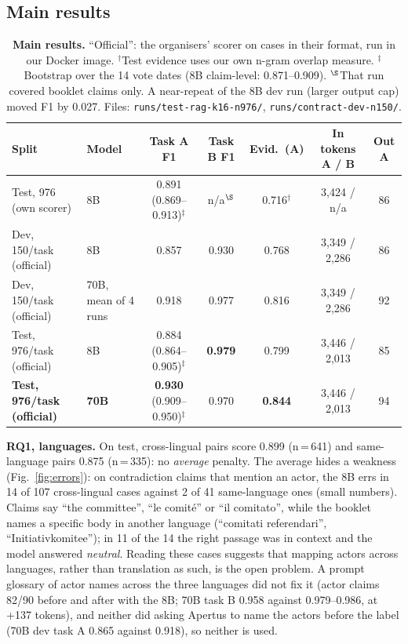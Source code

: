 \documentclass[10pt,a4paper]{article}
\begin{document}
\subsection{Main results}
\begin{table}[h]
\centering\small
\begin{tabular}{@{}llccccc@{}}
\toprule
Split & Model & Task A F1 & Task B F1 & Evid.\ (A) & In tokens A / B & Out A \\
\midrule
Test, 976 (own scorer) & 8B & 0.891 {\scriptsize(0.869--0.913)$^\ddagger$} & n/a$^\S$ & 0.716$^\dagger$ & 3{,}424 / n/a & 86 \\
Dev, 150/task (official) & 8B & 0.857 & 0.930 & 0.768 & 3{,}349 / 2{,}286 & 86 \\
Dev, 150/task (official) & 70B, mean of 4 runs & 0.918 & 0.977 & 0.816 & 3{,}349 / 2{,}286 & 92 \\
Test, 976/task (official) & 8B & 0.884 {\scriptsize(0.864--0.905)$^\ddagger$} & \textbf{0.979} & 0.799 & 3{,}446 / 2{,}013 & 85 \\
\textbf{Test, 976/task (official)} & \textbf{70B} & \textbf{0.930} {\scriptsize(0.909--0.950)$^\ddagger$} & 0.970 & \textbf{0.844} & 3{,}446 / 2{,}013 & 94 \\
\bottomrule
\end{tabular}
\caption{\textbf{Main results.} ``Official'': the organisers' scorer on cases in their format, run in
our Docker image. $^\dagger$Test evidence uses our own n-gram overlap measure. $^\ddagger$Bootstrap over the 14 vote
dates (8B claim-level: 0.871--0.909). $^\S$That run covered booklet claims only. A near-repeat of the 8B dev run (larger output cap) moved F1 by 0.027. Files: \texttt{runs/test-rag-k16-n976/}, \texttt{runs/contract-dev-n150/}.}
\label{tab:main}
\end{table}

\textbf{RQ1, languages.} On test, cross-lingual pairs score 0.899 (n\,=\,641) and same-language pairs
0.875 (n\,=\,335): no \emph{average} penalty. The average hides a weakness (Fig.~\ref{fig:errors}): on
contradiction claims that mention an actor, the 8B errs in 14 of 107 cross-lingual cases against 2 of 41
same-language ones (small numbers). Claims say ``the committee'', ``le comité'' or ``il comitato'', while
the booklet names a specific body in another language (``comitati referendari'',
``Initiativkomitee''); in 11 of the 14 the right passage was in context and the model answered
\emph{neutral}. Reading these cases suggests that mapping actors across languages, rather than
translation as such, is the open problem. A prompt glossary of actor names across the three languages did
not fix it (actor claims 82/90 before and after with the 8B; 70B task B 0.958 against 0.979--0.986, at
+137 tokens), and neither did asking Apertus to name the actors before the label (70B dev task A 0.865
against 0.918), so neither is used.
\end{document}
